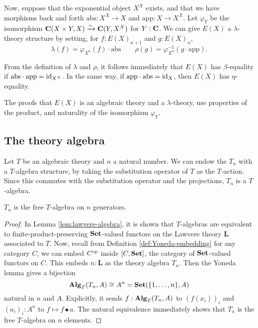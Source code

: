 \begin{definition}
  Now, suppose that the exponential object $ X^X $ exists, and that we have morphisms back and forth $ \mathrm{abs}: X^X \to X $ and $ \mathrm{app}: X \to X^X $. Let $ \varphi_Y $ be the isomorphism $ \mathbf{C}(X \times Y, X) \xrightarrow{\sim} \mathbf{C}(Y, X^X) $ for $ Y: \mathbf{C} $.
  We can give $ E(X) $ a $ \lambda $-theory structure by setting, for $ f: E(X)_{n + 1} $ and $ g: E(X)_n $,
  \[ \lambda(f) = \varphi_{X^n}(f) \cdot \mathrm{abs} \qquad \rho(g) = \varphi_{X^n}^{-1}(g \cdot \mathrm{app}). \]
\end{definition}

\begin{remark}
  From the definition of $ \lambda $ and $ \rho $, it follows immediately that $ E(X) $ has $ \beta $-equality if $ \mathrm{abs} \cdot \mathrm{app} = \text{id}_{X^X} $.
  In the same way, if $ \mathrm{app} \cdot \mathrm{abs} = \text{id}_{X} $, then $ E(X) $ has $ \eta $-equality.
\end{remark}

The proofs that $ E(X) $ is an algebraic theory and a $ \lambda $-theory, use properties of the product, and naturality of the isomorphism $ \varphi_Y $.

\subsection{The theory algebra}
\begin{example}\label{ex:theory-algebra}
  Let $ T $ be an algebraic theory and $ n $ a natural number. We can endow the $ T_n $ with a $ T $-algebra structure, by taking the substitution operator of $ T $ as the $ T $-action. Since this commutes with the substitution operator and the projections, $ T_n $ is a $ T $-algebra.
\end{example}

\begin{lemma}
  $ T_n $ is the free $ T $-algebra on $ n $ generators.
\end{lemma}
\begin{proof}
  In Lemma \ref{lem:lawvere-algebra}, it is shown that $ T $-algebras are equivalent to finite-product-preserving $ \mathbf{Set} $-valued functors on the Lawvere theory $ \mathbf L $ associated to $ T $. Now, recall from Definition \ref{def:Yoneda-embedding} for any category $ C $, we can embed $ C^{\text{op}} $ inside $ [C, \mathbf{Set}] $, the category of $ \mathbf{Set} $-valued functors on $ C $. This embeds $ n: \mathbf L $ as the theory algebra $ T_n $. Then the Yoneda lemma gives a bijection
  \[ \mathbf{Alg}_{T}(T_n, A) \cong A^n = \mathbf{Set}(\{ 1, \dots, n \}, A) \]
  natural in $ n $ and $ A $. Explicitly, it sends $ f: \mathbf{Alg}_{T}(T_n, A) $ to $ (f(x_i))_i $ and $ (a_i)_i : A^n $ to $ f \mapsto f \bullet a $. The natural equivalence immediately shows that $ T_n $ is the free $ T $-algebra on $ n $ elements.
\end{proof}

